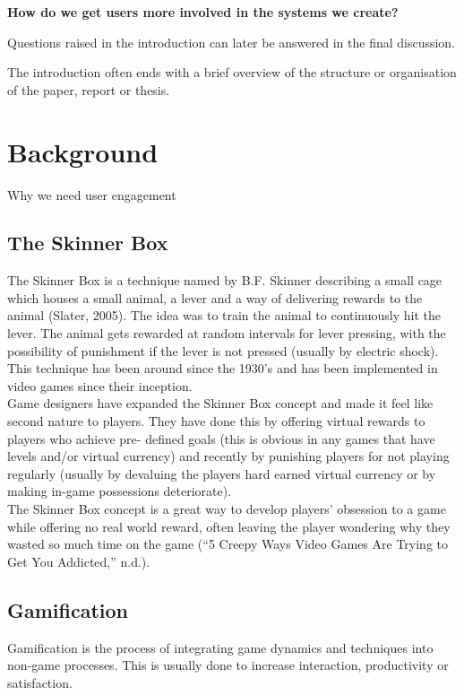 \documentclass[a4,12pt]{article}
\newenvironment{boxit}{\begin{lrbox}{\savepar}
        \begin{minipage}[b]{4.6in}}
        {\end{minipage}\end{lrbox}\fbox{\usebox{\savepar}}}
\begin{document}
\begin{center}
\begin{boxit}
\textbf{How do we get users more involved in the systems we create?}
\end{boxit}
\end{center}

Questions raised in the introduction can later be answered in the final discussion.

The introduction often ends with a brief overview of the structure or organisation of
the paper, report or thesis.

%
\section{Background}
Why we need user engagement
\subsection{The Skinner Box}
The Skinner Box is a technique named by B.F. Skinner describing a small cage which houses a small animal, a lever and a way of delivering rewards to the animal (Slater, 2005). The idea was to train the animal to continuously hit the lever. The animal gets rewarded at random intervals for lever pressing, with the possibility of punishment if the lever is not pressed (usually by electric shock). This technique has been around since the 1930’s and has been implemented in video games since their inception.
\\
Game designers have expanded the Skinner Box concept and made it feel like second nature to players. They have done this by offering virtual rewards to players who achieve pre- defined goals (this is obvious in any games that have levels and/or virtual currency) and recently by punishing players for not playing regularly (usually by devaluing the players hard earned virtual currency or by making in-game possessions deteriorate).
\\
The Skinner Box concept is a great way to develop players’ obsession to a game while offering no real world reward, often leaving the player wondering why they wasted so much time on the game \citep{QuinlanChalupMiddletonACRA2003}
(“5 Creepy Ways Video Games Are Trying to Get You Addicted,” n.d.).
\subsection{Gamification}
Gamification is the process of integrating game dynamics and techniques into non-game processes. This is usually done to increase interaction, productivity or satisfaction.
\end{document}
